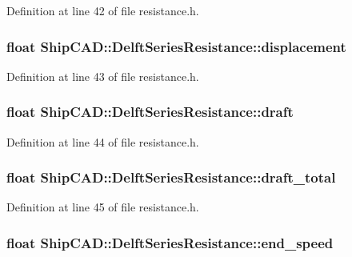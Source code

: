 Definition at line 42 of file resistance.\-h.

\hypertarget{structShipCAD_1_1DelftSeriesResistance_a1c98fdc7b3c1b28f6f8029af2e009992}{
\subsubsection[{displacement}]{\setlength{\rightskip}{0pt plus 5cm}float Ship\-C\-A\-D\-::\-Delft\-Series\-Resistance\-::displacement}}\label{structShipCAD_1_1DelftSeriesResistance_a1c98fdc7b3c1b28f6f8029af2e009992}


Definition at line 43 of file resistance.\-h.

\hypertarget{structShipCAD_1_1DelftSeriesResistance_a208e360c5ca0d029f9f433a7bc2cade2}{
\subsubsection[{draft}]{\setlength{\rightskip}{0pt plus 5cm}float Ship\-C\-A\-D\-::\-Delft\-Series\-Resistance\-::draft}}\label{structShipCAD_1_1DelftSeriesResistance_a208e360c5ca0d029f9f433a7bc2cade2}


Definition at line 44 of file resistance.\-h.

\hypertarget{structShipCAD_1_1DelftSeriesResistance_a4db81049e448c381019f97dc630d51af}{
\subsubsection[{draft\-\_\-total}]{\setlength{\rightskip}{0pt plus 5cm}float Ship\-C\-A\-D\-::\-Delft\-Series\-Resistance\-::draft\-\_\-total}}\label{structShipCAD_1_1DelftSeriesResistance_a4db81049e448c381019f97dc630d51af}


Definition at line 45 of file resistance.\-h.

\hypertarget{structShipCAD_1_1DelftSeriesResistance_abd1672b905c07093735775ff455e5a98}{
\subsubsection[{end\-\_\-speed}]{\setlength{\rightskip}{0pt plus 5cm}float Ship\-C\-A\-D\-::\-Delft\-Series\-Resistance\-::end\-\_\-speed}}\label{structShipCAD_1_1DelftSeriesResistance_abd1672b905c07093735775ff455e5a98}


